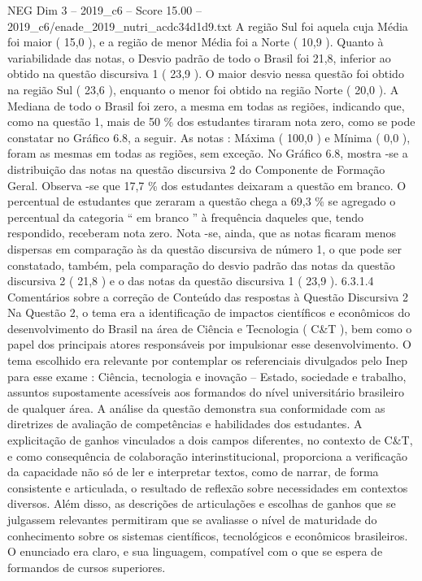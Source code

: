 \begin{textsample}{NEG Dim 3 – 2019\_c6 – Score 15.00 – 2019\_c6/enade\_2019\_nutri\_acdc34d1d9.txt}
A região Sul foi aquela cuja Média foi maior ( 15,0 ), e a região de menor Média foi a Norte ( 10,9 ).
Quanto à variabilidade das notas, o Desvio padrão de todo o Brasil foi 21,8, inferior ao obtido na questão discursiva 1 ( 23,9 ).
O maior desvio nessa questão foi obtido na região Sul ( 23,6 ), enquanto o menor foi obtido na região Norte ( 20,0 ).
A Mediana de todo o Brasil foi zero, a mesma em todas as regiões, indicando que, como na questão 1, mais de 50 \% dos estudantes tiraram nota zero, como se pode constatar no Gráfico 6.8, a seguir.
As notas : Máxima ( 100,0 ) e Mínima ( 0,0 ), foram as mesmas em todas as regiões, sem exceção.
No Gráfico 6.8, mostra -se a distribuição das notas na questão discursiva 2 do Componente de Formação Geral.
Observa -se que 17,7 \% dos estudantes deixaram a questão em branco.
O percentual de estudantes que zeraram a questão chega a 69,3 \% se agregado o percentual da categoria “ em branco ” à frequência daqueles que, tendo respondido, receberam nota zero.
Nota -se, ainda, que as notas ficaram menos dispersas em comparação às da questão discursiva de número 1, o que pode ser constatado, também, pela comparação do desvio padrão das notas da questão discursiva 2 ( 21,8 ) e o das notas da questão discursiva 1 ( 23,9 ). 6.3.1.4 Comentários sobre a correção de Conteúdo das respostas à Questão Discursiva 2 Na Questão 2, o tema era a identificação de impactos científicos e econômicos do desenvolvimento do Brasil na área de Ciência e Tecnologia ( C\&T ), bem como o papel dos principais atores responsáveis por impulsionar esse desenvolvimento.
O tema escolhido era relevante por contemplar os referenciais divulgados pelo Inep para esse exame : Ciência, tecnologia e inovação – Estado, sociedade e trabalho, assuntos supostamente acessíveis aos formandos do nível universitário brasileiro de qualquer área.
A análise da questão demonstra sua conformidade com as diretrizes de avaliação de competências e habilidades dos estudantes.
A explicitação de ganhos vinculados a dois campos diferentes, no contexto de C\&T, e como consequência de colaboração interinstitucional, proporciona a verificação da capacidade não só de ler e interpretar textos, como de narrar, de forma consistente e articulada, o resultado de reflexão sobre necessidades em contextos diversos.
Além disso, as descrições de articulações e escolhas de ganhos que se julgassem relevantes permitiram que se avaliasse o nível de maturidade do conhecimento sobre os sistemas científicos, tecnológicos e econômicos brasileiros.
O enunciado era claro, e sua linguagem, compatível com o que se espera de formandos de cursos superiores.

\end{textsample}
